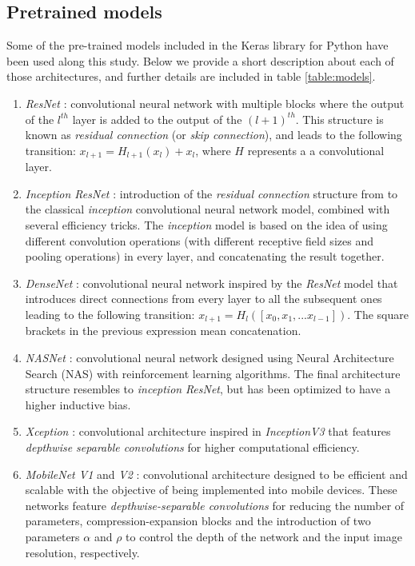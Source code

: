 \documentclass{elsarticle}
\begin{document}
    \subsection{Pretrained models}
    Some of the pre-trained models included in the Keras library for Python \citep{chollet2015keras} have been used along this study. Below we provide a short description about each of those architectures, and further details are included in table \ref{table:models}.

    \begin{enumerate}
    	\item \textit{ResNet} \citep{he2016}: convolutional neural network with multiple blocks where the output of the $l^{th}$ layer is added to the output of the $(l+1)^{th}$. This structure is known as \textit{residual connection} (or \textit{skip connection}), and leads to the following transition: $x_{l+1} = H_{l+1}(x_{l}) + x_l$, where $H$ represents a a convolutional layer.
    	\item \textit{Inception ResNet} \citep{szegedy2017}: introduction of the \textit{residual connection} structure from \citep{he2016} to the classical \textit{inception} convolutional neural network model, combined with several efficiency tricks. The \textit{inception} model is based on the idea of using different convolution operations (with different receptive field sizes and pooling operations) in every layer, and concatenating the result together.
    	\item \textit{DenseNet} \citep{huang2017}: convolutional neural network inspired by the \textit{ResNet} model \citep{he2016} that introduces direct connections from every layer to all the subsequent ones leading to the following transition: $x_{l+1} = H_l([x_0, x_1, ... x_{l-1}])$. The square brackets in the previous expression mean concatenation.
    	\item \textit{NASNet} \citep{pham2018}: convolutional neural network designed using Neural Architecture Search (NAS) with reinforcement learning algorithms. The final architecture structure resembles to \textit{inception} \textit{ResNet}, but has been optimized to have a higher inductive bias.
    	\item \textit{Xception} \citep{chollet2017}: convolutional architecture inspired in \textit{InceptionV3}  \citep{szegedy2016} that features \textit{depthwise separable convolutions} for higher computational efficiency.
    	\item \textit{MobileNet V1} and \textit{V2} \citep{howard2017, sandler2018}: convolutional architecture designed to be efficient and scalable with the objective of being implemented into mobile devices. These networks feature \textit{depthwise-separable convolutions} for reducing the number of parameters, compression-expansion blocks and the introduction of two parameters $\alpha$ and $\rho$ to control the depth of the network and the input image resolution, respectively.

\end{enumerate}
\end{document}
